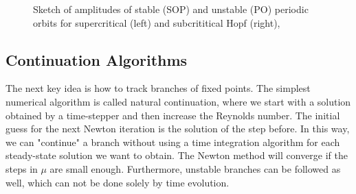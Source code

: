 \begin{figure}[ht]
\centering
\begin{subfigure}[t]{0.3\textwidth}
  \centering
\end{subfigure}
\hspace{0.1\textwidth}
\begin{subfigure}[t]{0.3\textwidth}
  \centering
\end{subfigure}
\caption{Sketch of amplitudes of stable (SOP) and unstable (PO) periodic orbits for supercritical (left) and subcrititical Hopf (right), }
\label{fig:hopf}
\end{figure}

\subsection{Continuation Algorithms} \label{sec:cont}

The next key idea is how to track branches of fixed points. The simplest
numerical algorithm is called natural continuation, where we start with a
solution obtained by a time-stepper and then increase the Reynolds number. The
initial guess for the next Newton iteration is the solution of the step before.
In this way, we can "continue" a branch without using a time integration
algorithm for each steady-state solution we want to obtain. The Newton method
will converge if the steps in $\mu$ are small enough. Furthermore, unstable
branches can be followed as well, which can not be done solely by time
evolution.

